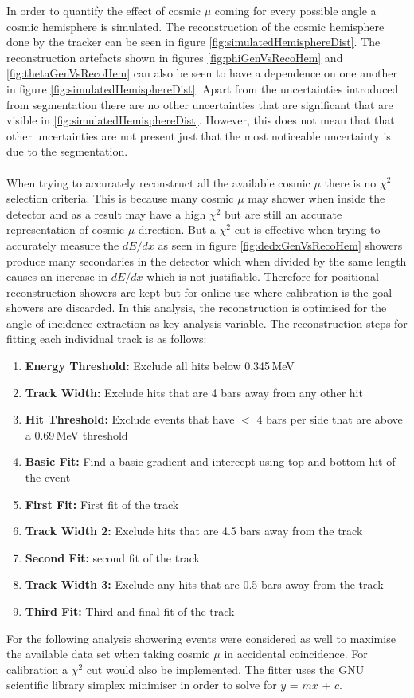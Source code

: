 In order to quantify the effect of cosmic $\mu$ coming for every possible angle a cosmic hemisphere is simulated. The reconstruction of the cosmic hemisphere done by the tracker can be seen in figure \ref{fig:simulatedHemisphereDist}. The reconstruction artefacts shown in figures \ref{fig:phiGenVsRecoHem} and \ref{fig:thetaGenVsRecoHem} can also be seen to have a dependence on one another in figure \ref{fig:simulatedHemisphereDist}. Apart from the uncertainties introduced from segmentation there are no other uncertainties that are significant that are visible in \ref{fig:simulatedHemisphereDist}. However, this does not mean that that other uncertainties are not present just that the most noticeable uncertainty is due to the segmentation. 
\\\\ When trying to accurately reconstruct all the available cosmic $\mu$ there is no $\chi^2$ selection criteria. This is because many cosmic $\mu$ may shower when inside the detector and as a result may have a high $\chi^2$ but are still an accurate representation of cosmic $\mu$ direction. But a $\chi^2$ cut is effective when trying to accurately measure the $dE/dx$ as seen in figure \ref{fig:dedxGenVsRecoHem} showers produce many secondaries in the detector which when divided by the same length causes an increase in $dE/dx$ which is not justifiable. Therefore for positional reconstruction showers are kept but for online use where calibration is the goal showers are discarded. In this analysis, the reconstruction is optimised for the angle-of-incidence extraction as key analysis variable. The reconstruction steps for fitting each individual track is as follows: 
\begin{enumerate}
  \item \textbf{Energy Threshold:} Exclude all hits below 0.345\,MeV
  \item \textbf{Track Width:} Exclude hits that are 4 bars away from any other hit 
  \item \textbf{Hit Threshold:} Exclude events that have $<$ 4 bars per side that are above a 0.69\,MeV threshold
  \item \textbf{Basic Fit:} Find a basic gradient and intercept using top and bottom hit of the event
  \item \textbf{First Fit:} First fit of the track 
  \item \textbf{Track Width 2:} Exclude hits that are 4.5 bars away from the track
  \item \textbf{Second Fit:} second fit of the track
  \item \textbf{Track Width 3:} Exclude any hits that are 0.5 bars away from the track
  \item \textbf{Third Fit:} Third and final fit of the track
\end{enumerate}
For the following analysis showering events were considered as well to maximise the available data set when taking cosmic $\mu$ in accidental coincidence. For calibration a $\chi^2$ cut would also be implemented. The fitter uses the GNU scientific library simplex minimiser \cite{galassi2002gnu} in order to solve for $y$ = $mx$ + $c$.  

